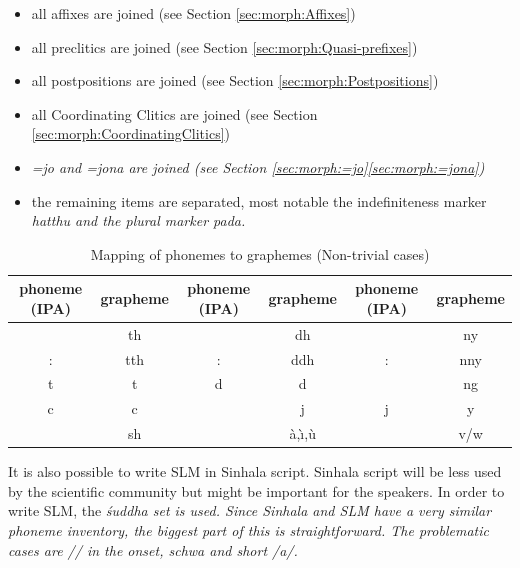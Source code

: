 \begin{itemize}
 \item all affixes are joined (see Section \ref{sec:morph:Affixes})
 \item all preclitics are joined (see Section \ref{sec:morph:Quasi-prefixes})
 \item all postpositions are joined (see Section \ref{sec:morph:Postpositions})
 \item all Coordinating Clitics are joined (see Section \ref{sec:morph:CoordinatingClitics})
 \item \em =jo \em and \em =jona \em are joined (see Section \ref{sec:morph:=jo}\ref{sec:morph:=jona})
 \item the remaining items are separated, most notable the indefiniteness marker \em hatthu \em and the plural marker \em pada\em.
\end{itemize}
 

\begin{table}
	\begin{center}
		\begin{tabular}{cc|cc|cc}
		phoneme (IPA) & grapheme & phoneme (IPA) 	& grapheme 	&phoneme (IPA) & grapheme \\ 
		\hline
		\dentt		& th    &        \dentd  	& dh 		&     \ny	& ny  \\ 
		\dentt:		& tth  	 &        \dentd: 	&ddh 		&    \ny: 	& nny\\
		t		& t      &        d 		& d  		&    \ng 	& ng \\
		c		& c      &        \J 		& j  		&    j 		& y \\
		 \textesh    	& sh      &        \E    	&  \`a,\`{\i},\`u	&     \V  	& v/w \\
		\end{tabular}
		\caption[Mapping of phonemes to graphemes]{Mapping of phonemes to graphemes (Non-trivial cases)}
		\label{tab:PhonemeMapping}
	\end{center}
\end{table}



It is also possible to write SLM in Sinhala script. Sinhala script will be less used by the scientific community but might be important for the speakers. In order to write SLM, the \em \'suddha  \em set is used. Since Sinhala and SLM have a very similar phoneme inventory, the biggest part of this is straightforward. The problematic cases are /\ng/ in the onset, schwa and short /a/.

